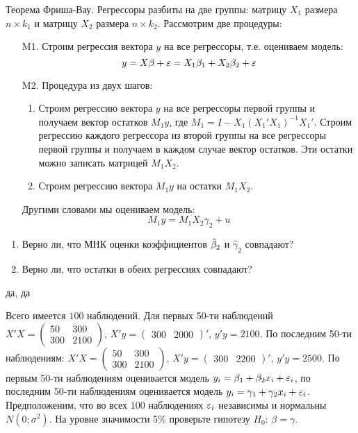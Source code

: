\documentclass[pdftex,11pt,openany]{book}\usepackage[]{graphicx}\usepackage[]{color}
\begin{document}
\begin{problem}
Теорема Фриша-Вау. Регрессоры разбиты на две группы: матрицу $X_1$ размера $n\times k_1$ и матрицу $X_2$ размера $n\times k_2$. Рассмотрим две процедуры:
\begin{enumerate}
\item[M1.] Строим регрессия вектора $y$ на все регрессоры, т.е. оцениваем модель:
\[ 
y=X\beta + \varepsilon = X_1 \beta_1 + X_2 \beta_2 +\varepsilon 
\]
\item[M2.] Процедура из двух шагов:
\begin{enumerate}
\item Строим регрессию вектора $y$ на все регрессоры первой группы и получаем вектор остатков $M_1 y$, где $M_1=I-X_1(X_1'X_1)^{-1}X_1'$. Строим регрессию каждого регрессора из второй группы на все регрессоры первой группы и получаем в каждом случае вектор остатков. Эти остатки можно записать матрицей $M_1 X_2$. 
\item Строим регрессию вектора $M_1 y$ на остатки $M_1 X_2$.
\end{enumerate}
Другими словами мы оцениваем модель:
\[
M_1 y = M_1 X_2 \gamma_2 + u
\]

\end{enumerate}
\begin{enumerate}
\item Верно ли, что МНК оценки коэффициентов $\hat{\beta}_2$ и $\hat{\gamma}_2$ совпадают?
\item Верно ли, что остатки в обеих регрессиях совпадают?
\end{enumerate}
\end{problem}
\begin{solution}
да, да
\end{solution}



\begin{problem}
Всего имеется $100$ наблюдений. Для первых 50-ти наблюдений $X'X=\begin{pmatrix}
50 & 300 \\
300 & 2100
\end{pmatrix}$, $X'y=\begin{pmatrix}
300 & 2000
\end{pmatrix}'$, $y'y=2100$. По последним 50-ти наблюдениям: $X'X=\begin{pmatrix}
50 & 300 \\
300 & 2100
\end{pmatrix}$, $X'y=\begin{pmatrix}
300 & 2200
\end{pmatrix}'$, $y'y=2500$. По первым 50-ти наблюдениям оценивается модель $y_i = \beta_1 + \beta_2 x_i + \varepsilon_i$, по последним 50-ти наблюдениям оценивается модель $y_i = \gamma_1 + \gamma_2 x_i + \varepsilon_i$. Предположеним, что во всех 100 наблюдениях $\varepsilon_i$ независимы и нормальны $N(0;\sigma^2)$. На уровне значимости 5\% проверьте гипотезу $H_0: \, \beta=\gamma$.
\end{problem}
\begin{solution}
\end{solution}
\end{document}
